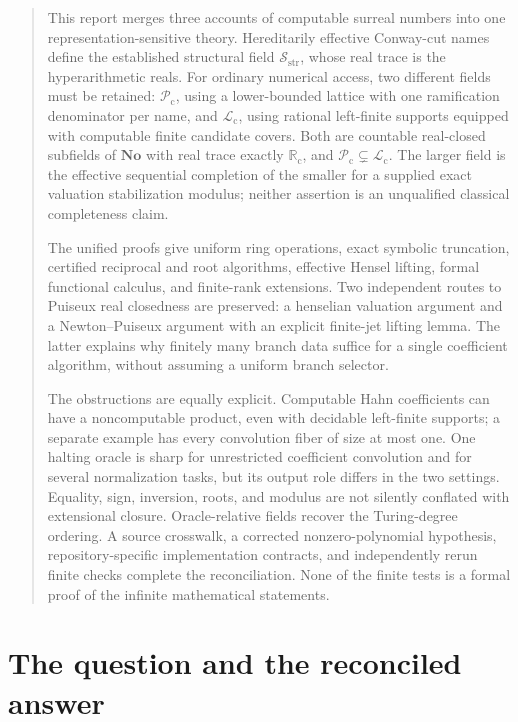 \documentclass[11pt,letterpaper]{article}
\numberwithin{equation}{section}
\theoremstyle{definition}
\theoremstyle{remark}
\newcommand{\No}{\mathbf{No}}
\newcommand{\Rc}{\mathbb R_{\mathrm c}}
\newcommand{\Sc}{\mathcal S_{\mathrm{str}}}
\newcommand{\Lc}{\mathcal L_{\mathrm c}}
\newcommand{\Pc}{\mathcal P_{\mathrm c}}
\begin{document}
\begin{abstract}
This report merges three accounts of computable surreal numbers into one
representation-sensitive theory. Hereditarily effective Conway-cut names define
the established structural field $\Sc$, whose real trace is the hyperarithmetic
reals. For ordinary numerical access, two different fields must be retained:
$\Pc$, using a lower-bounded lattice with one ramification denominator per
name, and $\Lc$, using rational left-finite supports equipped with computable
finite candidate covers. Both are countable real-closed subfields of $\No$
with real trace exactly $\Rc$, and $\Pc\subsetneq\Lc$. The larger field is the
effective sequential completion of the smaller for a supplied exact valuation
stabilization modulus; neither assertion is an unqualified classical
completeness claim.

The unified proofs give uniform ring operations, exact symbolic truncation,
certified reciprocal and root algorithms, effective Hensel lifting, formal
functional calculus, and finite-rank extensions. Two independent routes to
Puiseux real closedness are preserved: a henselian valuation argument and a
Newton--Puiseux argument with an explicit finite-jet lifting lemma. The latter
explains why finitely many branch data suffice for a single coefficient
algorithm, without assuming a uniform branch selector.

The obstructions are equally explicit. Computable Hahn coefficients can have
a noncomputable product, even with decidable left-finite supports; a separate
example has every convolution fiber of size at most one. One halting oracle
is sharp for unrestricted coefficient convolution and for several normalization
tasks, but its output role differs in the two settings. Equality, sign,
inversion, roots, and modulus are not silently conflated with extensional
closure. Oracle-relative fields recover the Turing-degree ordering. A source
crosswalk, a corrected nonzero-polynomial hypothesis, repository-specific
implementation contracts, and independently rerun finite checks complete the
reconciliation. None of the finite tests is a formal proof of the infinite
mathematical statements.
\end{abstract}
\begingroup
\small
\setlength{\parskip}{0pt}
\begin{multicols}{2}
\tableofcontents
\end{multicols}
\endgroup
\newpage

\section{The question and the reconciled answer}
\label{sec:introduction}
\end{document}

